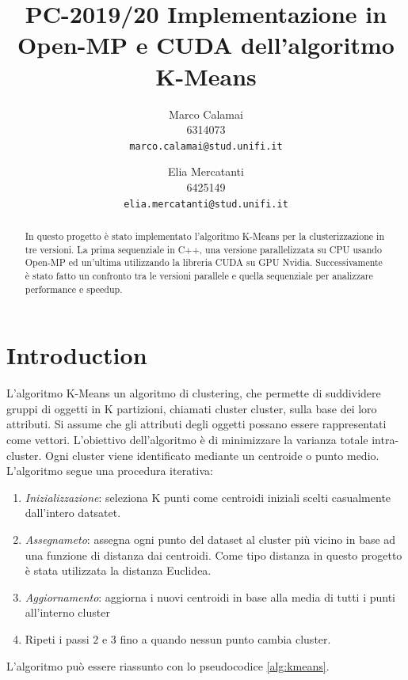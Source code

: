 \documentclass[10pt,twocolumn,letterpaper]{article}
\begin{document}
\title{PC-2019/20 Implementazione in Open-MP e CUDA dell'algoritmo K-Means}

\author{Marco Calamai\\
6314073\\
{\tt\small marco.calamai@stud.unifi.it}
\and
Elia Mercatanti\\
6425149\\
{\tt\small elia.mercatanti@stud.unifi.it}
}

\maketitle
\thispagestyle{empty}

\begin{abstract}
   In questo progetto è stato implementato l'algoritmo K-Means per la clusterizzazione in tre versioni. La prima sequenziale in C++, una versione parallelizzata su CPU usando Open-MP ed un'ultima utilizzando la libreria CUDA su GPU Nvidia. Successivamente è stato fatto un confronto tra le versioni parallele e quella sequenziale per analizzare performance e speedup.
\end{abstract}

\section{Introduction}
L'algoritmo K-Means un algoritmo di clustering, che permette di  suddividere  gruppi  di  oggetti  in  K  partizioni, chiamati cluster cluster,  sulla  base  dei  loro  attributi. Si  assume  che  gli  attributi  degli  oggetti  possano  essere  rappresentati  come  vettori. L'obiettivo  dell'algoritmo è  di  minimizzare  la  varianza  totale  intra-cluster. Ogni cluster viene identificato mediante un centroide o punto medio. L'algoritmo segue una procedura iterativa:
\begin{enumerate}
\item \textit{Inizializzazione}: seleziona K punti come centroidi iniziali scelti casualmente dall'intero datsatet.
\item \textit{Assegnameto}: assegna ogni punto del dataset al cluster più vicino in base ad una funzione di distanza dai centroidi. Come tipo distanza in questo progetto è stata utilizzata la distanza Euclidea.
\item \textit{Aggiornamento}: aggiorna i nuovi centroidi in base alla media di tutti i punti all'interno cluster
\item Ripeti i passi $2$ e $3$ fino a quando nessun punto cambia cluster.
\end{enumerate}
L'algoritmo può essere riassunto con lo pseudocodice \ref{alg:kmeans}.
\newpage
\end{document}
